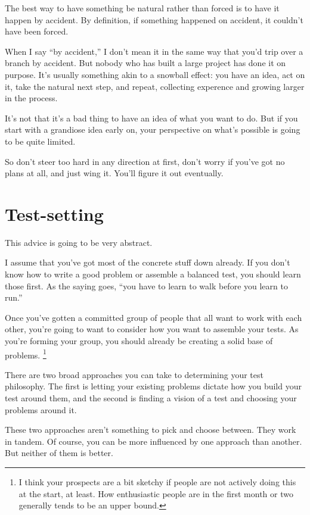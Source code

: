 \documentclass[points=false]{bounce}
\begin{document}
The best way to have something be natural rather than forced
is to have it happen by accident.
By definition, if something happened on accident,
it couldn't have been forced.

When I say ``by accident,'' I don't mean it in the same way
that you'd trip over a branch by accident.
But nobody who has built a large project
has done it on purpose.
It's usually something akin to a snowball effect:
you have an idea, act on it, take the natural next step,
and repeat, collecting experence and growing larger in the process.

It's not that it's a bad thing to have an idea of what you want to do.
But if you start with a grandiose idea early on,
your perspective on what's possible is going to be quite limited.

So don't steer too hard in any direction at first,
don't worry if you've got no plans at all,
and just wing it. You'll figure it out eventually.

\section{Test-setting}

This advice is going to be very abstract.

I assume that you've got
most of the concrete stuff down already.
If you don't know how to write a good problem
or assemble a balanced test,
you should learn those first.
As the saying goes,
``you have to learn to walk
before you learn to run.''

Once you've gotten a committed group of people that all want to work with each other,
you're going to want to consider how you want to assemble your tests.
As you're forming your group, you should already be creating a solid base of problems.
\footnote{I think your prospects are a bit sketchy
if people are not actively doing this at the start, at least.
How enthusiastic people are in the first month or two
generally tends to be an upper bound.}

There are two broad approaches
you can take to determining
your test philosophy.
The first is letting your
existing problems dictate
how you build your test around them,
and the second is finding
a vision of a test and
choosing your problems around it.

These two approaches aren't
something to pick and choose between.
They work in tandem.
Of course, you can be more
influenced by one approach than another.
But neither of them is better.
\end{document}
